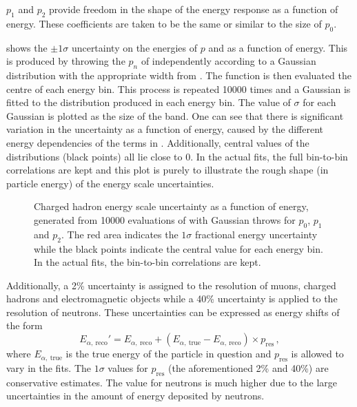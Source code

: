 $p_{1}$ and $p_{2}$ provide freedom in the shape of the energy response as a function of energy.
These coefficients are taken to be the same or similar to the size of $p_{0}$.

 shows the $\pm1\sigma$ uncertainty on the energies of $p$ and \pipm as a function of energy.
This is produced by throwing the $p_{n}$ of  independently according to a Gaussian distribution with the appropriate width from . The function is then evaluated the centre of each energy bin.
This process is repeated \num{10000} times and a Gaussian is fitted to the distribution produced in each energy bin.
The value of $\sigma$ for each Gaussian is plotted as the size of the band.
One can see that there is significant variation in the uncertainty as a function of energy, caused by the different energy dependencies of the terms in .
Additionally, central values of the distributions (black points) all lie close to 0.
In the actual fits, the full bin-to-bin correlations are kept and this plot is purely to illustrate the rough shape (in particle energy) of the energy scale uncertainties.

\begin{figure}[h]
  \begin{adjustbox}{max totalsize=.6\textwidth, center}
    
  \end{adjustbox}
  \caption[Charged hadron energy scale uncertainty as a function of energy.]{Charged hadron energy scale uncertainty as a function of energy, generated from \num{10000} evaluations of  with Gaussian throws for $p_{0}$, $p_{1}$ and $p_{2}$. The red area indicates the $1\sigma$ fractional energy uncertainty while the black points indicate the central value for each energy bin. In the actual fits, the bin-to-bin correlations are kept.}
  \label{fig:protonEScale}
\end{figure}

Additionally, a 2\% uncertainty is assigned to the resolution of muons, charged hadrons and electromagnetic objects while a 40\% uncertainty is applied to the resolution of neutrons.
These uncertainties can be expressed as energy shifts of the form
\begin{equation}
	E_{\alpha,~\text{reco}}' = E_{\alpha,~\text{reco}} + \left( E_{\alpha,~\text{true}} - E_{\alpha,~\text{reco}} \right) \times p_{\text{res}} \, ,
\end{equation}
where $E_{\alpha,~\text{true}}$ is the true energy of the particle in question and $p_{\text{res}}$ is allowed to vary in the fits.
The $1\sigma$ values for $p_{\text{res}}$ (the aforementioned 2\% and 40\%) are conservative estimates. 
The value for neutrons is much higher due to the large uncertainties in the amount of energy deposited by neutrons.

